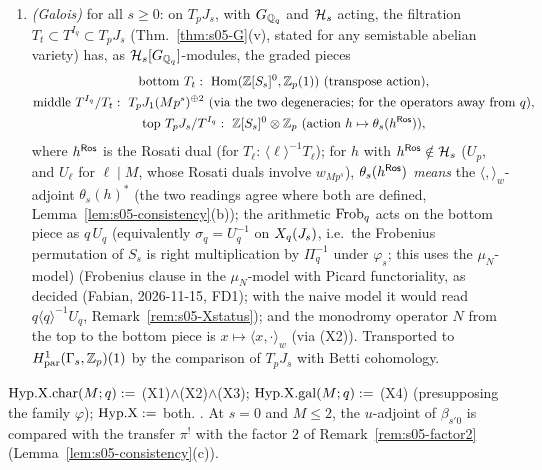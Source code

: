 \begin{hypothesis}
\begin{enumerate}[label=(X\arabic*)]
\item \emph{(Galois)} for all $s\ge0$: on $T_pJ_s$, with $G_{\mathbb{Q}_q}$ and $\mathcal{H}_s$ acting, the filtration $T_t\subset T^{I_q}\subset T_pJ_s$
  (Thm.~\ref{thm:s05-G}(v), stated for any semistable abelian variety) has, as $\mathcal{H}_s[G_{\mathbb{Q}_q}]$-modules, the graded pieces
  \[\begin{gathered}\text{bottom }T_t:\ \Hom(\Z[S_s]^0,\Zp(1))\ (\text{transpose action}),\\
  \text{middle }T^{I_q}/T_t:\ T_pJ_1(Mp^s)^{\oplus2}\ (\text{via the two degeneracies; for the operators away from $q$}),\\
  \text{top }T_pJ_s/T^{I_q}:\ \Z[S_s]^0\otimes\Zp\ (\text{action }h\mapsto\theta_s(h^\Ros)),\end{gathered}\]
  where $h^{\mathsf{Ros}}$ is the Rosati dual (for $T_\ell$: $\langle\ell\rangle^{-1}T_\ell$); for $h$ with $h^{\mathsf{Ros}}\notin\mathcal{H}_s$ ($U_p$, and $U_\ell$ for
  $\ell\mid M$, whose Rosati duals involve $w_{Mp^s}$), $\theta_s(h^{\mathsf{Ros}})$ \emph{means} the $\langle,\rangle_w$-adjoint $\theta_s(h)^*$ (the two readings
  agree where both are defined, Lemma~\ref{lem:s05-consistency}(b)); the arithmetic $\mathrm{Frob}_q$ acts on the bottom piece as $q\,U_q$
  (equivalently $\sigma_q=U_q^{-1}$ on $X_q(J_s)$, i.e.\ the Frobenius permutation of $S_s$ is right multiplication by $\Pi_q^{-1}$ under
  $\varphi_s$; this uses the $\mu_N$-model)
  (Frobenius clause in the $\mu_N$-model with Picard functoriality, as decided (Fabian, 2026-11-15, FD1); with the naive model it would read
  $q\langle q\rangle^{-1}U_q$, Remark~\ref{rem:s05-Xstatus});
  and the monodromy operator $N$ from the top to the bottom piece is $x\mapsto\langle x,\cdot\rangle_w$ (via (X2)). Transported to
  $H^1_{\rm par}(\Gamma_s,\mathbb{Z}_p)(1)$ by the comparison of $T_pJ_s$ with Betti cohomology.
\end{enumerate}
$\mathrm{Hyp.X.char}(M;q):=$ (X1)$\wedge$(X2)$\wedge$(X3); $\mathrm{Hyp.X.gal}(M;q):=$ (X4) (presupposing the family $\varphi$); $\mathrm{Hyp.X}:=$ both. \sthyp.
At $s=0$ and $M\le2$, the $u$-adjoint of $\beta_{s'0}$ is compared with the transfer $\pi^!$ with the factor $2$ of Remark~\ref{rem:s05-factor2} (Lemma~\ref{lem:s05-consistency}(c)).
\end{hypothesis}

